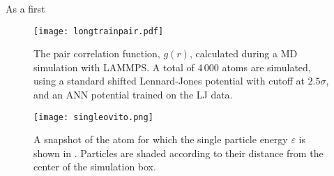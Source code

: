 \documentclass[../../master.tex]{subfiles}
\begin{document}
As a first 


\begin{SCfigure}
\centering
\texttt{[image: longtrainpair.pdf]}
\caption{The pair correlation function, $g(r)$, calculated during a MD simulation with LAMMPS. A total of 4\,000 atoms are simulated, using a standard shifted Lennard-Jones potential with cutoff at $2.5\sigma$, and an ANN potential trained on the LJ data.\label{fig:ljpair}}
\end{SCfigure}






\begin{figure}
\centering
\texttt{[image: singleovito.png]}
\caption{A snapshot of the atom for which the single particle energy $\varepsilon$ is shown in . Particles are shaded according to their distance from the center of the simulation box.   \label{fig:singleovito}}
\end{figure}
\end{document}
